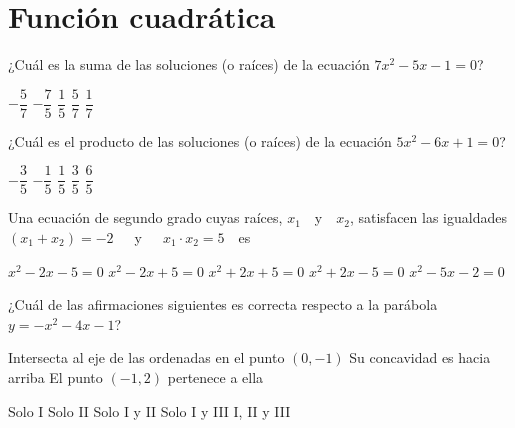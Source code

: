 \documentclass[sin nombre]{srs2}
\begin{document}
\section{Función cuadrática}

\begin{preguntas}
\pregunta ¿Cuál es la suma de las soluciones (o raíces) de la ecuación $7x^2 - 5x - 1 = 0$?
\begin{alternativas}
\alternativa $-\dfrac{5}{7}$
\alternativa $-\dfrac{7}{5}$
\alternativa $\dfrac{1}{5}$
\alternativa $\dfrac{5}{7}$
\alternativa $\dfrac{1}{7}$
\end{alternativas}

\pregunta ¿Cuál es el producto de las soluciones (o raíces) de la ecuación $5x^2 - 6x + 1 = 0$?
\begin{alternativas}
\alternativa $-\dfrac{3}{5}$
\alternativa $-\dfrac{1}{5}$
\alternativa $\dfrac{1}{5}$
\alternativa $\dfrac{3}{5}$
\alternativa $\dfrac{6}{5}$
\end{alternativas}

\pregunta Una ecuación de segundo grado cuyas raíces, $x_1$~~y~~$x_2$, satisfacen las igualdades $\left(x_1 + x_2\right) = -2$~~~y~~~$x_1 \cdot x_2 = 5$~~es
\begin{alternativas}
\alternativa $x^2 - 2x - 5 = 0$
\alternativa $x^2 - 2x + 5 = 0$
\alternativa $x^2 + 2x + 5 = 0$
\alternativa $x^2 + 2x - 5 = 0$
\alternativa $x^2 - 5x - 2 = 0$
\end{alternativas}

\pregunta ¿Cuál de las afirmaciones siguientes es correcta respecto a la parábola $y = -x^2 - 4x - 1$?
\begin{opciones}
\opcion Intersecta al eje de las ordenadas en el punto $\left(0, -1\right)$
\opcion Su concavidad es hacia arriba
\opcion El punto $\left(-1, 2\right)$ pertenece a ella
\end{opciones}
\begin{alternativas}
\alternativa Solo I
\alternativa Solo II
\alternativa Solo I y II
\alternativa Solo I y III
\alternativa I, II y III
\end{alternativas}


\end{preguntas}
\end{document}
